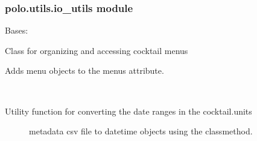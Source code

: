 \documentclass[letterpaper,10pt,english]{sphinxmanual}
\begin{document}
\subsubsection{polo.utils.io\_utils module}
\label{\detokenize{polo.utils:module-polo.utils.io_utils}}\label{\detokenize{polo.utils:polo-utils-io-utils-module}}

\begin{fulllineitems}
\label{\detokenize{polo.utils:polo.utils.io_utils.BarTender}}
Bases: 

Class for organizing and accessing cocktail menus

\begin{fulllineitems}
\label{\detokenize{polo.utils:polo.utils.io_utils.BarTender.add_menus_from_metadata}}
Adds menu objects to the menus attribute.

\end{fulllineitems}


\begin{fulllineitems}
\label{\detokenize{polo.utils:polo.utils.io_utils.BarTender.date_range_parser}}~\begin{description}
\item[{Utility function for converting the date ranges in the cocktail.units}] \leavevmode
metadata csv file to datetime objects using the 
classmethod.


\end{description}
\end{fulllineitems}
\end{fulllineitems}
\end{document}
